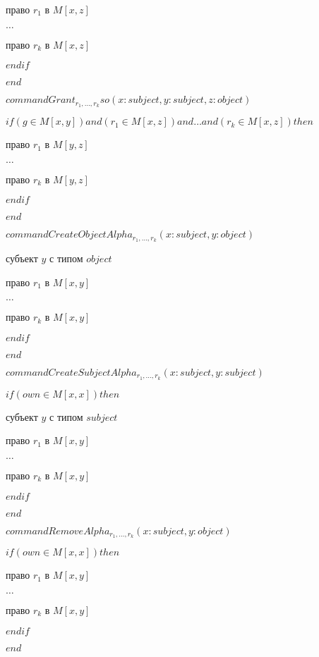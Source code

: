 		 право $r_1$ в $M[x,z]$
		
		$\ldots$

		 право $r_k$ в $M[x,z]$

		$endif$

		$end$
		
	

		$command  Grant_{r_1, \ldots, r_k}so(x: subject,y:subject,z:object)$

		$if (g \in M[x,y]) and (r_1 \in M[x,z]) and  \ldots and (r_k \in M[x,z]) then $

		 право $r_1$ в $M[y,z]$
		
		$\ldots$

		 право $r_k$ в $M[y,z]$

		$endif$

		$end$
		
		
		$command  CreateObjectAlpha_{r_1, \ldots, r_k}(x: subject,y:object)$

		
		 субъект $y$ с типом $object$

		 право $r_1$ в $M[x,y]$
		
		$\ldots$

		 право $r_k$ в $M[x,y]$

		$endif$

		$end$
		
		
			
		$command  CreateSubjectAlpha_{r_1, \ldots, r_k}(x: subject,y:subject)$

		$if (own \in M[x,x]) then $
		
		 субъект $y$ с типом $subject$

		 право $r_1$ в $M[x,y]$
		
		$\ldots$

		 право $r_k$ в $M[x,y]$

		$endif$

		$end$
		
		
		
		$command  RemoveAlpha_{r_1, \ldots, r_k}(x: subject,y:object)$

		$if (own \in M[x,x]) then $

		 право $r_1$ в $M[x,y]$
		
		$\ldots$

		 право $r_k$ в $M[x,y]$

		$endif$

		$end$
		